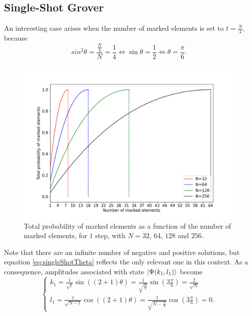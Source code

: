 \documentclass[../../dissertation.tex]{subfiles}
\begin{document}
\subsection{Single-Shot Grover}
An interesting case arises when the number of marked elements is set to $t=\frac{N}{4}$, because 
\begin{equation}
	sin^2\theta = \frac{\frac{N}{4}}{N} = \frac{1}{4} \iff \sin\theta = \frac{1}{2} \iff \theta = \frac{\pi}{6}. 
	\label{eq:singleShotTheta}
\end{equation}
\begin{figure}[h]
	\centering
	\includegraphics[scale=0.40]{img/Grover/GroverSingleShot3264128256}
	\caption{Total probability of marked elements as a function of the number of marked elements, for $1$ step, with $N=32$, $64$, $128$ and $256$.} 
	\label{GroverSingleShot3264128256}
\end{figure}
Note that there are an infinite number of negative and positive solutions, but
equation \ref{eq:singleShotTheta} reflects the only relevant one in this
context. As a consequence, amplitudes associated with state
$\ket{\Psi(k_1,l_1)}$ become 
\begin{equation}
	\begin{cases}
		k_{1} = \frac{1}{\sqrt{t}} \sin{((2+1)\theta)} = \frac{1}{\sqrt{\frac{N}{4}}} \sin{(3\frac{\pi}{6})} = \frac{2}{\sqrt{N}}
		\\l_{1} = \frac{1}{\sqrt{N-t}}\cos{((2+1)\theta)} = \frac{1}{\sqrt{N-\frac{N}{4}}}\cos{(3\frac{\pi}{6})} = 0.
	\end{cases}\label{eq:groverSingleShotKandJ}
\end{equation}
\end{document}
